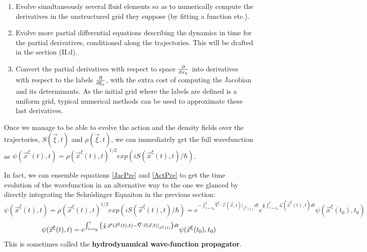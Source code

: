 \documentclass[11pt, a4paper]{article} %
\newcommand{\Lg}{\mathscr{L}}
\begin{document}
\begin{enumerate}
\item Evolve simultaneously several fluid elements so as to numerically compute the derivatives in the unstructured grid they suppose (by fitting a function etc.).
\item Evolve more partial differential equations describing the dynamics in time for the partial derivatives, conditioned along the trajectories. This will be drafted in the section (II.d).
\item Convert the partial derivatives with respect to space $\pdv{}{x_k}$ into derivatives with respect to the labels $\pdv{}{\xi_j}$, with the extra cost of computing the Jacobian and its determinants. As the initial grid where the labels are defined is a uniform grid, typical numerical methods can be used to approximate these last derivatives. \vspace{-0.25cm}
\end{enumerate}

Once we manage to be able to evolve the action and the density fields over the trajectories, $S(\vec{\xi},t)$ and $\rho(\vec{\xi},t)$, we can immediately get the full wavefunction as $\psi(\vec{x}^\xi(t),t)=\rho(\vec{x}^\xi(t),t)^{1/2}exp(iS(\vec{x}^\xi(t),t)/\hbar)$.

In fact, we can ensemble equations \eqref{JacPre} and \eqref{ActPre} to get the time evolution of the wavefunction in an alternative way to the one we glanced by directly integrating the Schrödinger Equaiton in the previous section:
\begin{equation}
\psi(\vec{x}^\xi(t),t)=\rho(\vec{x}^\xi(t),t)^{1/2}exp(iS(\vec{x}^\xi(t),t)/\hbar)=e^{-\int_{t=t_0}^t \vec{\nabla}\cdot \vec{v}(\vec{x},t)\rvert_{\vec{x}^\xi(t)} dt}e^{\frac{i}{\hbar}\int_{t=t_0}^t \Lg(\vec{x}^\xi(t),t) dt}\psi(\vec{x}^\xi(t_0),t_0)
\end{equation}
$$
\psi(\vec{x}^\xi(t),t)=e^{\int_{t=t_0}^t\qty( \frac{i}{\hbar} \Lg(\vec{x}^\xi(t),t)- \vec{\nabla}\cdot \vec{v}(\vec{x},t)\rvert_{\vec{x}^\xi(t)} )dt}\psi(\vec{x}^\xi(t_0),t_0)
$$
This is sometimes called the {\bf hydrodynamical wave-function propagator}.\vspace{-0.2cm}
\end{document}
